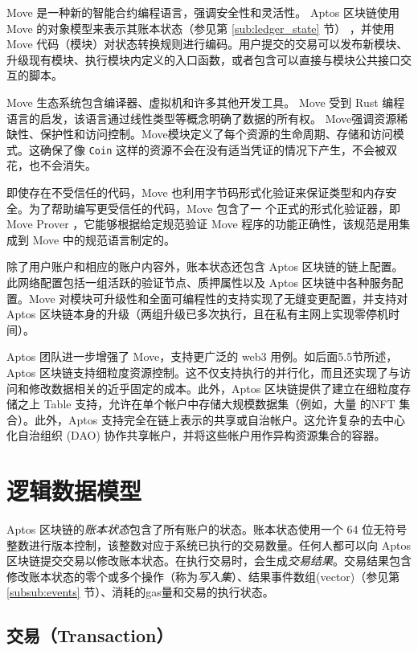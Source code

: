 \documentclass{article}
\begin{document}
Move 是⼀种新的智能合约编程语⾔，强调安全性和灵活性。 Aptos 区块链使⽤ Move 的对象模型来表⽰其账本状态（参见第 \ref{sub:ledger_state} 节） ，并使⽤ Move 代码（模块）对状态转换规则进行编码。⽤户提交的交易可以发布新模块、升级现有模块、执行模块内定义的入口函数，或者包含可以直接与模块公共接⼝交互的脚本。

Move ⽣态系统包含编译器、虚拟机和许多其他开发⼯具。 Move 受到 Rust 编程语⾔的启发，该语言通过线性类型等概念明确了数据的所有权。 Move强调资源稀缺性、保护性和访问控制。Move模块定义了每个资源的⽣命周期、存储和访问模式。这确保了像 \texttt{Coin} 这样的资源不会在没有适当凭证的情况下产⽣，不会被双花，也不会消失。

即使存在不受信任的代码，Move 也利⽤字节码形式化验证来保证类型和内存安全。为了帮助编写更受信任的代码，Move 包含了⼀ 个正式的形式化验证器，即 Move Prover \cite{move_prover}，它能够根据给定规范验证 Move 程序的功能正确性，该规范是用集成到 Move 中的规范语⾔制定的。 

除了⽤户账户和相应的账户内容外，账本状态还包含 Aptos 区块链的链上配置。此⽹络配置包括⼀组活跃的验证节点、质押属性以及 Aptos 区块链中各种服务配置。Move 对模块可升级性和全⾯可编程性的⽀持实现了⽆缝变更配置，并⽀持对Aptos 区块链本⾝的升级（两组升级已多次执行，且在私有主⽹上实现零停机时间）。

Aptos 团队进⼀步增强了 Move，⽀持更⼴泛的 web3 ⽤例。如后⾯5.5节所述，Aptos 区块链支持细粒度资源控制。这不仅⽀持执行的并行化，⽽且还实现了与访问和修改数据相关的近乎固定的成本。此外，Aptos 区块链提供了建⽴在细粒度存储之上 Table ⽀持，允许在单个帐户中存储⼤规模数据集（例如，⼤量 的NFT 集合）。此外，Aptos ⽀持完全在链上表⽰的共享或⾃治帐户。这允许复杂的去中⼼化⾃治组织 (DAO) 协作共享帐户，并将这些帐户⽤作异构资源集合的容器。


\section{逻辑数据模型}
\label{sec:logical}

Aptos 区块链的\emph{账本状态}包含了所有账户的状态。账本状态使用一个 64 位无符号整数进行版本控制，该整数对应于系统已执行的交易数量。任何人都可以向 Aptos 区块链提交交易以修改账本状态。在执行交易时，会生成\emph{交易结果}。交易结果包含修改账本状态的零个或多个操作（称为\emph{写入集}）、结果事件数组(vector)（参见第 \ref{subsub:events} 节）、消耗的gas量和交易的执行状态。

\subsection{交易（Transaction）}
\end{document}
